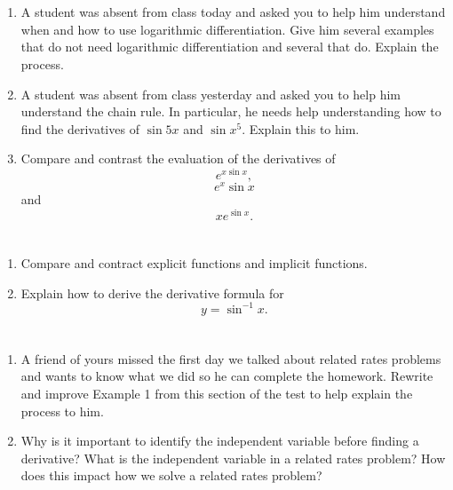 \section{}
\begin{enumerate}%

\item  A student was absent from class today and asked you to help him understand when and how to use logarithmic differentiation.  Give him several examples that do not need logarithmic differentiation and several that do.  Explain the process.

\item  A student was absent from class yesterday and asked you to help him understand the chain rule.  In particular, he needs help understanding how to find the derivatives of $\sin 5 x$ and $\sin x^5$.  Explain this to him.

\item  Compare and contrast the evaluation of the derivatives of $$e^{x\sin x} ,$$ $$e^x \sin x$$ and $$xe^{\sin x} .$$

\end{enumerate}
\section{}
\begin{enumerate}%

\item  Compare and contract explicit functions and implicit functions.

\item  Explain how to derive the derivative formula for $$y = \sin ^{ - 1} x.$$



\end{enumerate}
\section{}
\begin{enumerate}%

\item  A friend of yours missed the first day we talked about related rates problems and wants to know what we did so he can complete the homework.  Rewrite and improve Example 1 from this section of the test to help explain the process to him.  

\item  Why is it important to identify the independent variable before finding a derivative?  What is the independent variable in a related rates problem?  How does this impact how we solve a related rates problem?  

\end{enumerate}
